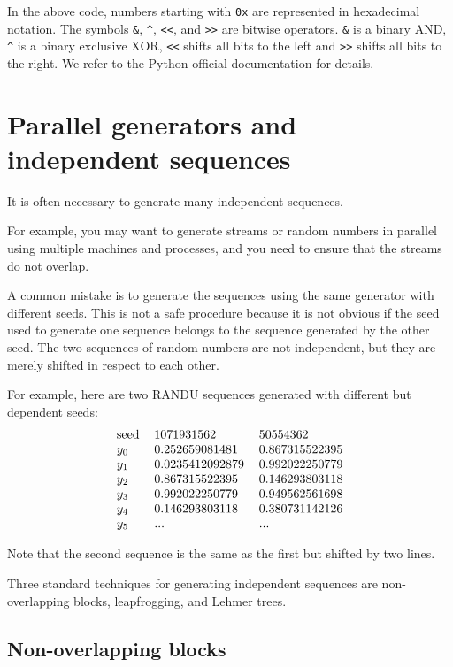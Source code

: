 \documentclass[justified,sixbynine]{tufte-book}
\theoremstyle{plain}%
\theoremstyle{definition}
\theoremstyle{remark}
\begin{document}
\begin{fullwidth}
In the above code, numbers starting with \verb!0x! are represented in hexadecimal notation. The symbols \verb!&!, \verb!^!, \verb!<<!, and \verb!>>! are bitwise operators. \verb!&! is a binary AND,  \verb!^! is a binary exclusive XOR,  \verb!<<! shifts all bits to the left and  \verb!>>! shifts all bits to the right. We refer to the Python official documentation for details.

\goodbreak\section{Parallel generators and independent sequences}

It is often necessary to generate many independent sequences.

For example, you may want to generate streams or random numbers in parallel using multiple machines and processes, and you need to ensure that the streams do not overlap.

A common mistake is to generate the sequences using the same
generator with different seeds. This is not a safe procedure because it is
not obvious if the seed used to generate one sequence belongs to the
sequence generated by the other seed. The two
sequences of random numbers are not independent, but they are merely
shifted in respect to each other.

For example, here are two RANDU sequences generated with different but dependent
seeds:
\begin{equation}
\begin{tabular}{lll}
seed & 1071931562 & 50554362 \\
$y_0$ & 0.252659081481 & 0.867315522395 \\
$y_1$ & 0.0235412092879 & 0.992022250779 \\
$y_2$ & 0.867315522395 & 0.146293803118 \\
$y_3$ & 0.992022250779 & 0.949562561698 \\
$y_4$ & 0.146293803118 & 0.380731142126 \\
$y_5$ & ... & ...
\end{tabular}
\end{equation}

Note that the second sequence is the same as the first but shifted by two
lines.

Three standard techniques for generating independent sequences are
non-overlapping blocks, leapfrogging, and Lehmer trees.

\goodbreak\subsection{Non-overlapping blocks}


\end{fullwidth}
\end{document}
